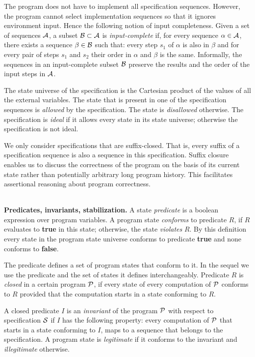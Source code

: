 \documentclass[11pt]{llncs}
\def\PROG#1{${\cal #1}$}
\def\MPROG#1{{\cal #1}}
\begin{document}
The program does not have to implement all specification
sequences. However, the program cannot select implementation sequences
so that it ignores environment input. Hence the following notion of
input completeness.  Given a set of sequences \PROG{A}, a subset
$\MPROG{B} \subset\MPROG{A}$ is \emph{input-complete} if, for every
sequence $\alpha \in \MPROG{A}$, there exists a sequence $\beta \in
\MPROG{B}$ such that: every step $s_1$ of $\alpha$ is also in $\beta$
and for every pair of steps $s_1$ and $s_2$ their order in $\alpha$
and $\beta$ is the same. Informally, the sequences in an
input-complete subset \PROG{B} preserve the results and the order of
the input steps in \PROG{A}.


The state universe of the specification is the Cartesian product of
the values of all the external variables. The state that is present in
one of the specification sequences is \emph{allowed} by the
specification. The state is \emph{disallowed} otherwise. The
specification is \emph{ideal} if it allows every state in its state
universe; otherwise the specification is not ideal.

We only consider specifications that are suffix-closed. That is, every
suffix of a specification sequence is also a sequence in this
specification. Suffix closure enables us to discuss the correctness of
the program on the basis of its current state rather than potentially
arbitrary long program history. This facilitates assertional reasoning
about program correctness.

\ \\ \textbf{Predicates, invariants, stabilization.} A state
\emph{predicate} is a boolean expression over program variables. A
program state \emph{conforms} to predicate $R$, if $R$ evaluates to
\textbf{true} in this state; otherwise, the state \emph{violates} $R$.
By this definition every state in the program state universe conforms
to predicate \textbf{true} and none conforms to \textbf{false}.

The predicate defines a set of program states that conform to it. In
the sequel we use the predicate and the set of states it defines
interchangeably. Predicate $R$ is \emph{closed} in a certain program
\PROG{P}, if every state of every computation of \PROG{P} conforms to
$R$ provided that the computation starts in a state conforming to $R$.

A closed predicate $I$ is an \emph{invariant} of the program \PROG{P}
with respect to specification \PROG{S} if $I$ has the following
property: every computation of \PROG{P} that starts in a state
conforming to $I$, maps to a sequence that belongs to the
specification.  A program state is \emph{legitimate} if it conforms to
the invariant and \emph{illegitimate} otherwise. 
\end{document}
